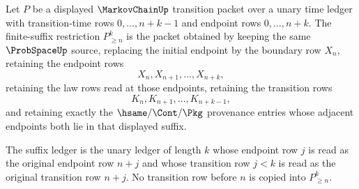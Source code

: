 \begin{definition}
\label{def:markovchain-finite-suffix-restriction}
Let $P$ be a displayed $\MarkovChainUp$ transition packet over a unary time ledger with transition-time rows $0,\ldots,n+k-1$ and endpoint rows $0,\ldots,n+k$. The finite-suffix restriction $P_{\ge n}^{k}$ is the packet obtained by keeping the same $\ProbSpaceUp$ source, replacing the initial endpoint by the boundary row $X_n$, retaining the endpoint rows
$$
X_n,X_{n+1},\ldots,X_{n+k},
$$
retaining the law rows read at those endpoints, retaining the transition rows
$$
K_n,K_{n+1},\ldots,K_{n+k-1},
$$
and retaining exactly the $\hsame/\Cont/\Pkg$ provenance entries whose adjacent endpoints both lie in that displayed suffix.

The suffix ledger is the unary ledger of length $k$ whose endpoint row $j$ is read as the original endpoint row $n+j$ and whose transition row $j<k$ is read as the original transition row $n+j$. No transition row before $n$ is copied into $P_{\ge n}^{k}$.
\end{definition}

